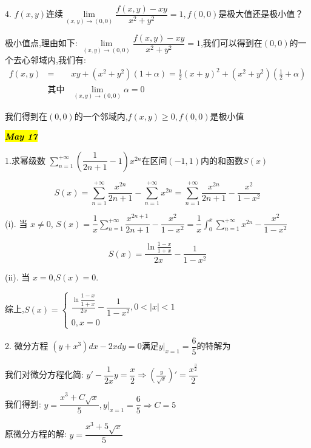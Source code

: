 
4. $f(x,y)\text{连续}\lim\limits_{(x,y)\rightarrow (0,0)}\dfrac{f(x,y)-xy}{x^2+y^2}=1,f(0,0)\text{是极大值还是极小值？}$ 
\begin{solution}
	
	极小值点,理由如下: 
	$\lim\limits_{(x,y)\rightarrow (0,0)}\dfrac{f(x,y)-xy}{x^2+y^2}=1$,我们可以得到在$(0,0)$的一个去心邻域内,我们有: 
	\begin{eqnarray*}
		f(x,y)&=&xy+(x^2+y^2)(1+\alpha)=\frac{1}{2}(x+y)^2+(x^2+y^2)(\frac{1}{2}+\alpha)\\
		&\text{其中}&\lim\limits_{(x,y)\rightarrow (0,0)}\alpha=0
	\end{eqnarray*}

	我们得到在$(0,0)$的一个邻域内,$f(x,y)\geq 0,f(0,0)\text{是极小值}$
\end{solution}


\hl{\textbf{\textit{May 17}}}

1.求幂级数 $\sum\limits_{n=1}^{+\infty}(\dfrac{1}{2n+1}-1)x^{2n}\text{在区间}(-1,1)\text{内的和函数} S(x)$
\begin{solution}
	
	$$S(x)=\sum\limits_{n=1}^{+\infty}\frac{x^{2n}}{2n+1}-\sum\limits_{n=1}^{+\infty}x^{2n}=\sum\limits_{n=1}^{+\infty}\frac{x^{2n}}{2n+1}-\frac{x^2}{1-x^2}$$
	
	(i). 当 $x\neq 0$, $S(x)=\dfrac{1}{x}\sum\limits_{n=1}^{+\infty}\dfrac{x^{2n+1}}{2n+1}-\dfrac{x^2}{1-x^2}=\dfrac{1}{x}\int_{0}^{x}\sum\limits_{n=1}^{+\infty}x^{2n}-\dfrac{x^2}{1-x^2}$
	
	$$S(x)=\frac{\ln\frac{1-x}{1+x}}{2x}-\frac{1}{1-x^2}$$
	
	(ii). 当 $x=0$,$S(x)=0$.
	
	综上,$S(x)=\left\lbrace 
	\begin{array}{l}
		\frac{\ln\dfrac{1-x}{1+x}}{2x}-\dfrac{1}{1-x^2},0<|x|<1\\
		0,x=0
	\end{array}
	\right.$
\end{solution}


2. 微分方程 $(y+x^3)dx-2xdy=0\text{满足}y|_{x=1}=\dfrac{6}{5}\text{的特解为}$
\begin{solution}
	
	我们对微分方程化简: $y'-\dfrac{1}{2x}y=\dfrac{x}{2}\Rightarrow (\frac{y}{\sqrt{x}})'=\dfrac{x^{\frac{3}{2}}}{2}$
	
	我们得到: $y=\dfrac{x^3+C\sqrt{x}}{5},y|_{x=1}=\dfrac{6}{5}\Rightarrow C=5$
	
	原微分方程的解: $y=\dfrac{x^3+5\sqrt{x}}{5}$
\end{solution}

